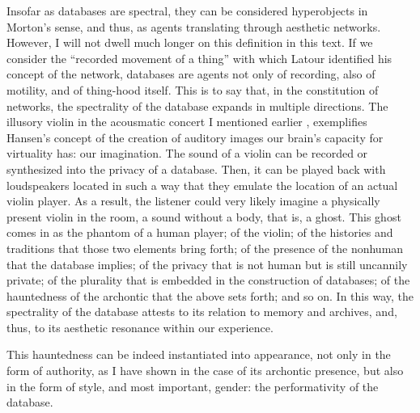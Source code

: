 Insofar as databases are spectral, they can be considered hyperobjects in Morton's sense, and thus, as agents translating through aesthetic networks.
However, I will not dwell much longer on this definition in this text. 
%
If we consider the ``recorded movement of a thing'' with which Latour identified his concept of the network, %
databases are agents not only of recording, also of motility, and of thing-hood itself. 
%
This is to say that, in the constitution of networks, the spectrality of the database expands in multiple directions. 
%
The illusory violin in the acousmatic concert I mentioned earlier , exemplifies Hansen's concept of the creation of auditory images our brain's capacity for virtuality has: our imagination. The sound of a violin can be recorded or synthesized into the privacy of a database. Then, it can be played back with loudspeakers located in such a way that they emulate the location of an actual violin player. As a result, the listener could very likely imagine a physically present violin in the room, a sound without a body, that is, a ghost. This ghost comes in as the phantom of a human player; of the violin; of the histories and traditions that those two elements bring forth; of the presence of the nonhuman that the database implies; of the privacy that is not human but is still uncannily private; of the plurality %
that is embedded in the construction of databases; of the hauntedness of the archontic that the above sets forth; and so on. In this way, the spectrality of the database attests to its relation to memory and archives, and, thus, to its aesthetic resonance within our experience.

This hauntedness can be indeed instantiated into appearance, not only in the form of authority, as I have shown in the case of its archontic presence, but also in the form of style, and most important, gender: the performativity of the database.

